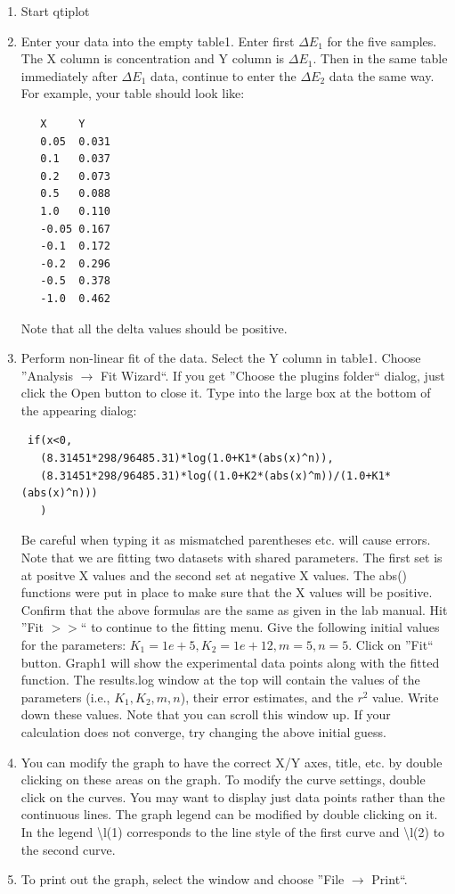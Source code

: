 \documentclass[byrevtex,amssymb,aps,pra,floatfix,letterpaper]{revtex4}
\begin{document}
\begin{enumerate}
\item Start qtiplot

\item  Enter your data into the empty table1. Enter first $\Delta E_1$ for the five samples. The X column is concentration and Y column is $\Delta E_1$. Then in the same table immediately after $\Delta E_1$ data, continue to enter the $\Delta E_2$ data the same way. For example, your table should look like:

\begin{verbatim}
   X     Y
   0.05	 0.031
   0.1	 0.037
   0.2	 0.073
   0.5	 0.088
   1.0	 0.110
   -0.05 0.167
   -0.1	 0.172
   -0.2	 0.296
   -0.5	 0.378
   -1.0	 0.462
\end{verbatim}

Note that all the delta values should be positive.

\item  Perform non-linear fit of the data. Select the Y column in table1. Choose ''Analysis $\rightarrow$ Fit Wizard``. If you get ''Choose the plugins folder`` dialog, just click the Open button to close it. Type into the large box at the bottom of the appearing dialog:

\begin{verbatim}
 if(x<0,
   (8.31451*298/96485.31)*log(1.0+K1*(abs(x)^n)),
   (8.31451*298/96485.31)*log((1.0+K2*(abs(x)^m))/(1.0+K1*(abs(x)^n)))
   )
\end{verbatim}

Be careful when typing it as mismatched parentheses etc. will cause errors. Note that we are fitting two datasets with shared parameters. The first set is at positve X values and the second set at negative X values. The abs() functions were put in place to make sure that the X values will be positive. Confirm that the above formulas are the same as given in the lab manual. Hit ''Fit $>>$`` to continue to the fitting menu. Give the following initial values for the parameters:   $K_1 = 1e+5, K_2 = 1e+12, m = 5, n = 5$.  Click on ''Fit`` button. Graph1 will show the experimental data points along with the fitted function. The results.log window at the top will contain the values of the parameters (i.e., $K_1,K_2,m,n$), their error estimates, and the $r^2$ value. Write down these values. Note that you can scroll this window up. If your calculation does not converge, try changing the above initial guess.

\item You can modify the graph to have the correct X/Y axes, title, etc. by double clicking on these areas on the graph. To modify the curve settings, double click on the curves. You may want to display just data points rather than the continuous lines. The graph legend can be modified by double clicking on it. In the legend \textbackslash l(1) corresponds to the line style of the first curve and \textbackslash l(2) to the second curve.

\item To print out the graph, select the window and choose ''File $\rightarrow$ Print``.

\end{enumerate}
\end{document}

